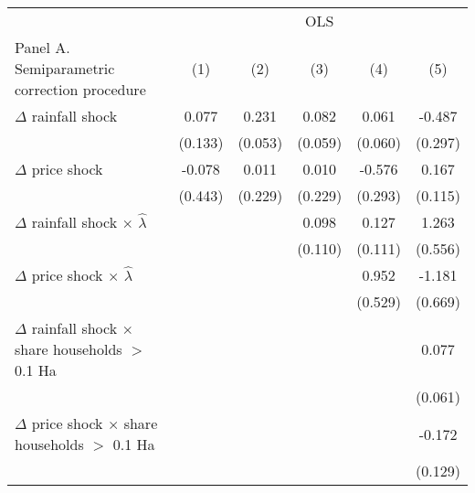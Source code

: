 \begin{table}[H]
\centering\begingroup\fontsize{10}{12}\selectfont

\begin{tabular}{lccccc}
\toprule
\multicolumn{1}{c}{ } & \multicolumn{5}{c}{OLS} \\
\cmidrule(l{3pt}r{3pt}){2-6}
Panel A. Semiparametric correction procedure & (1) & (2) & (3) & (4) & (5)\\
\midrule
$\Delta$ rainfall shock & 0.077 & 0.231 & 0.082 & 0.061 & -0.487\\
 & (0.133) & (0.053) & (0.059) & (0.060) & (0.297)\\
$\Delta$ price shock & -0.078 & 0.011 & 0.010 & -0.576 & 0.167\\
 & (0.443) & (0.229) & (0.229) & (0.293) & (0.115)\\
$\Delta$ rainfall shock $\times$ $\widehat{\lambda}$ &  &  & 0.098 & 0.127 & 1.263\\
\addlinespace
 &  &  & (0.110) & (0.111) & (0.556)\\
$\Delta$ price shock $\times$ $\widehat{\lambda}$ &  &  &  & 0.952 & -1.181\\
 &  &  &  & (0.529) & (0.669)\\
$\Delta$ rainfall shock $\times$ share households $>$ 0.1 Ha &  &  &  &  & 0.077\\
 &  &  &  &  & (0.061)\\
\addlinespace
$\Delta$ price shock $\times$ share households $>$ 0.1 Ha &  &  &  &  & -0.172\\
 &  &  &  &  & (0.129)\\

\end{tabular}
\endgroup{}
\end{table}
